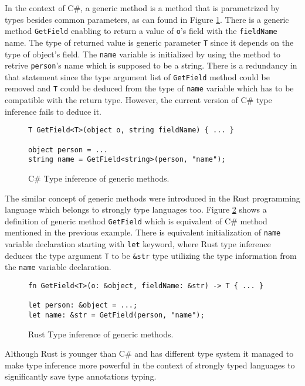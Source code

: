 In the context of C\#, a generic method is a method that is parametrized by types besides common parameters, as can found in Figure \ref{img03:csharp_gen_meth}.
There is a generic method \texttt{GetField} enabling to return a value of \texttt{o}'s field with the \texttt{fieldName} name.
The type of returned value is generic parameter \texttt{T} since it depends on the type of object's field.
The \texttt{name} variable is initialized by using the method to retrive \texttt{person}'s name which is supposed to be a string.
There is a redundancy in that statement since the type argument list of \texttt{GetField} method could be removed and \texttt{T} could be deduced from the type of \texttt{name} variable which has to be compatible with the return type.
However, the current version of C\# type inference fails to deduce it.
\begin{figure}
\begin{lstlisting}[style=csharp]
T GetField<T>(object o, string fieldName) { ... }

object person = ...
string name = GetField<string>(person, "name");
\end{lstlisting}
\caption{C\# Type inference of generic methods.}
\label{img03:csharp_gen_meth}
\end{figure}
\par
The similar concept of generic methods were introduced in the Rust \cite{online:rust} programming language which belongs to strongly type languages too.
Figure \ref{img04:rust_gen_meth} shows a definition of generic method \texttt{GetField} which is equivalent of C\# method mentioned in the previous example.
There is equivalent initialization of \texttt{name} variable declaration starting with \texttt{let} keyword, where Rust type inference deduces the type argument \texttt{T} to be \texttt{\&str} type utilizing the type information from the \texttt{name} variable declaration.
\begin{figure}[h]
\begin{lstlisting}[style=csharp]
fn GetField<T>(o: &object, fieldName: &str) -> T { ... }

let person: &object = ...;
let name: &str = GetField(person, "name");
\end{lstlisting}
\caption{Rust Type inference of generic methods.}
\label{img04:rust_gen_meth}
\end{figure}
\par
Although Rust is younger than C\# and has different type system it managed to make type inference more powerful in the context of strongly typed languages to significantly save type annotations typing.
